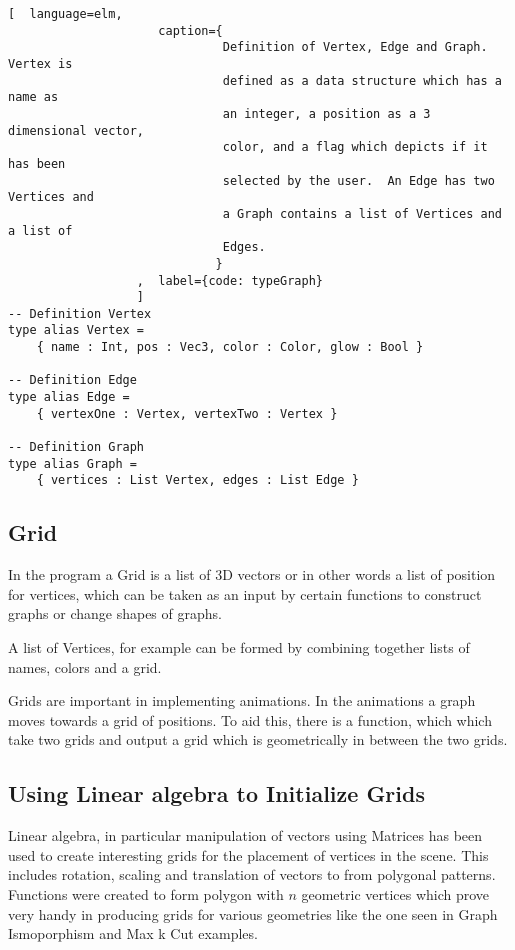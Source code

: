 \begin{lstlisting}[  language=elm, 
                     caption={
                              Definition of Vertex, Edge and Graph.  Vertex is
                              defined as a data structure which has a name as
                              an integer, a position as a 3 dimensional vector,
                              color, and a flag which depicts if it has been
                              selected by the user.  An Edge has two Vertices and
                              a Graph contains a list of Vertices and a list of
                              Edges.
                             }
                  ,  label={code: typeGraph}
                  ]
-- Definition Vertex
type alias Vertex =
    { name : Int, pos : Vec3, color : Color, glow : Bool }

-- Definition Edge
type alias Edge =
    { vertexOne : Vertex, vertexTwo : Vertex }

-- Definition Graph
type alias Graph =
    { vertices : List Vertex, edges : List Edge }
\end{lstlisting}

\subsection{Grid}
In the program a Grid is a list of 3D vectors or in other words a list of
position for vertices, which can be taken as an input by certain functions to
construct graphs or change shapes of graphs. 

A list of Vertices, for example can be formed by combining together lists of
names, colors and a grid.

Grids are important in implementing animations. In the animations a graph moves
towards a grid of positions. To aid this, there is a function, which which
take two grids and output a grid which is geometrically in between the two
grids.

\subsection{Using Linear algebra to Initialize Grids}
Linear algebra, in particular manipulation of vectors using Matrices has been
used to create interesting grids for the placement of vertices in the scene.
This includes rotation, scaling and translation of vectors to from polygonal
patterns. Functions were created to form polygon with $n$ geometric vertices
which prove very handy in producing grids for various geometries like
the one seen in Graph Ismoporphism and Max k Cut examples.

